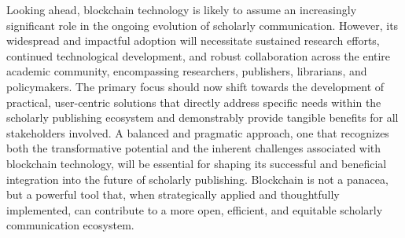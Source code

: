 \documentclass{article}
\begin{document}
Looking ahead, blockchain technology is likely to assume an increasingly significant role in the ongoing evolution of scholarly communication. However, its widespread and impactful adoption will necessitate sustained research efforts, continued technological development, and robust collaboration across the entire academic community, encompassing researchers, publishers, librarians, and policymakers. The primary focus should now shift towards the development of practical, user-centric solutions that directly address specific needs within the scholarly publishing ecosystem and demonstrably provide tangible benefits for all stakeholders involved. A balanced and pragmatic approach, one that recognizes both the transformative potential and the inherent challenges associated with blockchain technology, will be essential for shaping its successful and beneficial integration into the future of scholarly publishing. Blockchain is not a panacea, but a powerful tool that, when strategically applied and thoughtfully implemented, can contribute to a more open, efficient, and equitable scholarly communication ecosystem.





\end{document}
